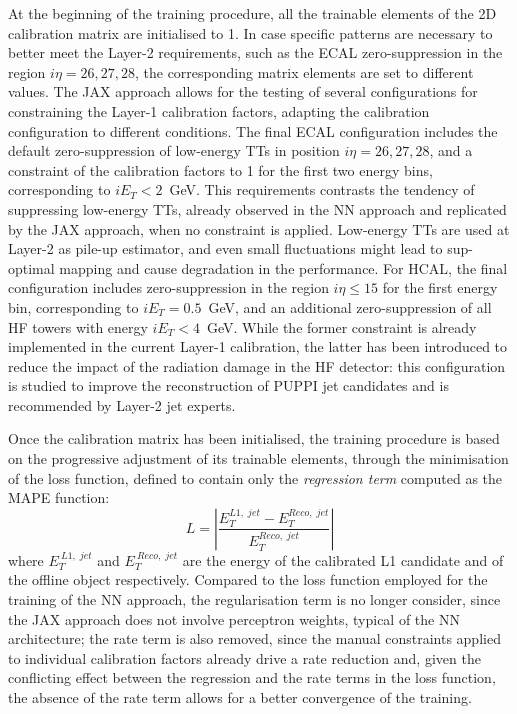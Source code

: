 At the beginning of the training procedure, all the trainable elements of the 2D calibration matrix are initialised to 1. In case specific patterns are necessary to better meet the Layer-2 requirements, such as the ECAL zero-suppression in the region $i\eta=26,27,28$, the corresponding matrix elements are set to different values.
The JAX approach allows for the testing of several configurations for constraining the Layer-1 calibration factors, adapting the calibration configuration to different conditions.
The final ECAL configuration includes the default zero-suppression of low-energy TTs in position $i\eta=26,27,28$, and a constraint of the calibration factors to 1 for the first two energy bins, corresponding to $iE_T<2$~GeV.
This requirements contrasts the tendency of suppressing low-energy TTs, already observed in the NN approach and replicated by the JAX approach, when no constraint is applied. Low-energy TTs are used at Layer-2 as pile-up estimator, and even small fluctuations might lead to sup-optimal mapping and cause degradation in the performance.
For HCAL, the final configuration includes zero-suppression in the region $i\eta\leq15$ for the first energy bin, corresponding to $iE_T=0.5$~GeV, and an additional zero-suppression of all HF towers with energy $iE_T<4$~GeV. While the former constraint is already implemented in the current Layer-1 calibration, the latter has been introduced to reduce the impact of the radiation damage in the HF detector: this configuration is studied to improve the reconstruction of PUPPI jet candidates and is recommended by Layer-2 jet experts.

\bigbreak

Once the calibration matrix has been initialised, the training procedure is based on the progressive adjustment of its trainable elements, through the minimisation of the loss function, defined to contain only the \textit{regression term} computed as the MAPE function:
\begin{equation}
    L=\left|\frac{E_T^{L1,\;jet} - E_T^{Reco,\;jet}}{E_T^{Reco,\;jet}}\right|
\end{equation}
where $E_T^{\:L1,\;jet}$ and $E_T^{\:Reco,\;jet}$ are the energy of the calibrated L1 candidate and of the offline object respectively. 
Compared to the loss function employed for the training of the NN approach, the regularisation term is no longer consider, since the JAX approach does not involve perceptron weights, typical of the NN architecture; the rate term is also removed, since the manual constraints applied to individual calibration factors already drive a rate reduction and, given the conflicting effect between the regression and the rate terms in the loss function, the absence of the rate term allows for a better convergence of the training.

